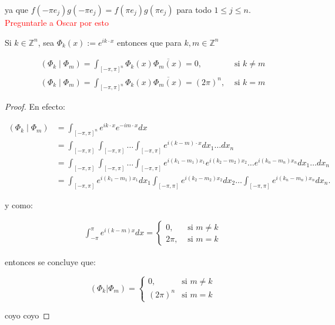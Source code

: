\documentclass[12pt]{article}
\begin{document}
ya que $f(-\pi e_j)g(-\pi e_j)=f(\pi e_j)g(\pi e_j)$ para todo $1\leq j\leq n$.\\

\textcolor{red}{Preguntarle a Oscar por esto}

\begin{theorem}
Si $k \in \mathbb{Z}^n$, sea $\Phi_k(x):=e^{i k \cdot x}$ entonces que para $k, m \in \mathbb{Z}^n$

$$
\begin{array}{ll}
\displaystyle\left(\Phi_k \mid \Phi_m\right)=\int_{[-\pi, \pi]^n} \Phi_k(x) \overline{\Phi_m(x)}=0, & \text { si } k \neq m \\
\displaystyle\left(\Phi_k \mid \Phi_m\right)=\int_{[-\pi, \pi]^n} \Phi_k(x) \overline{\Phi_m(x)}=(2 \pi)^n, & \text { si } k=m
\end{array}
$$
\end{theorem}

\begin{proof}
En efecto:

\begin{align*}
    \left(\Phi_k \mid \Phi_m\right)&=\int_{[-\pi,\pi]^n}e^{ik \cdot x}e^{-im\cdot x}dx\\
    &=\int_{[-\pi,\pi]}\int_{[-\pi,\pi]}\ldots \int_{[-\pi,\pi]}e^{i(k-m) \cdot x}dx_1\ldots dx_n\\
    &=\int_{[-\pi,\pi]}\int_{[-\pi,\pi]}\ldots \int_{[-\pi,\pi]}e^{i(k_1-m_1) x_1}e^{i(k_2-m_2) x_2}\ldots e^{i(k_n-m_n) x_n}dx_1\ldots dx_n\\
    &=\int_{[-\pi,\pi]}e^{i(k_1-m_1) x_1}dx_1\int_{[-\pi,\pi]}e^{i(k_2-m_2) x_2}dx_2\ldots \int_{[-\pi,\pi]} e^{i(k_n-m_n) x_n}dx_n
.\end{align*}

y como:

$$
\begin{aligned}
\int_{-\pi}^\pi e^{i(k-m)x} d x= \begin{cases}0, & \text { si } m \neq k \\
2 \pi, & \text { si } m=k\end{cases}
\end{aligned}
$$

entonces se concluye que:

$$(\Phi_k|\Phi_m)=\begin{cases}
0, \quad &\text{si } m\neq k\\
(2\pi)^n &\text{si } m=k
\end{cases}$$


coyo coyo
\end{proof}
\end{document}

